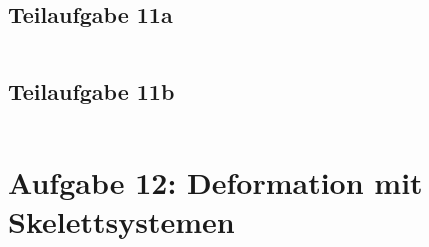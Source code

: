 \documentclass[a4paper]{scrartcl}
\begin{document}
\subsection*{Teilaufgabe 11a}
\inputminted[linenos, numbersep=5pt, tabsize=4, frame=lines, label=shader.vert]{glsl}{shader.vert}

\clearpage
\subsection*{Teilaufgabe 11b}
\inputminted[linenos, numbersep=5pt, tabsize=4, frame=lines, label=shader.frag]{glsl}{shader.frag}

\clearpage
\section*{Aufgabe 12: Deformation mit Skelettsystemen}
\inputminted[linenos, numbersep=5pt, tabsize=4, frame=lines, label=skelett.vert]{glsl}{skelett.vert}
\end{document}
